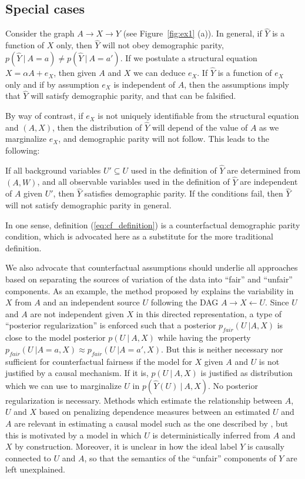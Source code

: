 \subsection{Special cases}

Consider the graph $A \rightarrow X \rightarrow Y$ (see Figure~\ref{fig:ex1} (a)). In general, if $\hat Y$ is a function of $X$ only, then $\hat Y$ will not obey demographic parity, $p(\hat Y\ |\ A = a) \neq p(\hat Y\ |\ A = a')$.  If we postulate a structural equation $X = \alpha A + e_X$, then given $A$ and $X$ we can deduce $e_X$. If $\hat Y$ is a function of $e_X$ only and if by assumption $e_X$ is independent of $A$, then the assumptions imply that $\hat Y$ will satisfy demographic parity, and that can be falsified.

By way of contrast, if $e_X$ is not uniquely identifiable from the structural equation and $(A, X)$, then the distribution of $\hat Y$ will depend of the value of $A$ as we marginalize $e_X$, and demographic parity will not follow. This leads to the following:

\begin{lem}
If all background variables $U' \subseteq U$ used in the definition of $\hat Y$ are determined from $(A, W)$, and all observable variables used in the definition of $\hat Y$ are independent of $A$ given $U'$, then $\hat Y$ satisfies demographic parity. If the conditions fail, then $\hat Y$ will not satisfy demographic parity in general. 
\end{lem}
  
In one sense, definition (\ref{eq:cf_definition}) is a counterfactual demographic parity condition, which is advocated here as a substitute for the more traditional definition.

We also advocate that counterfactual assumptions should underlie all approaches based on separating the sources of variation of the data into ``fair'' and ``unfair'' components. As an example, the method proposed by \cite{louizos2015variational} explains the variability in $X$ from $A$ and an independent source $U$ following the DAG $A \rightarrow X \leftarrow U$. Since $U$ and $A$ are not independent given $X$ in this directed representation, a type of ``posterior regularization'' \citep{ganchev:10} is enforced such that a posterior $p_{fair}(U\ | A, X)$ is close to the model posterior $p(U\ |\ A, X)$ while having the property $p_{fair}(U\ | A = a, X) \approx p_{fair}(U\ | A = a', X)$. But this is neither necessary nor sufficient for counterfactual fairness if the model for $X$ given $A$ and $U$ is not justified by a causal mechanism. If it is, $p(U\ |\ A, X)$ is justified as distribution which we can use to marginalize $U$ in $p(\hat Y(U)\ |\ A, X)$. No posterior regularization is necessary.  Methods which estimate the relationship between $A$, $U$ and $X$ based on penalizing dependence measures between an estimated $U$ and $A$ are relevant in estimating a causal model such as the one described by \citep{mooij:09}, but this is motivated by a model in which $U$ is deterministically inferred from $A$ and $X$ by construction. Moreover, it is unclear in \cite{louizos2015variational} how the ideal label $Y$ is causally connected to $U$ and $A$, so that the semantics of the ``unfair''
components of $Y$ are left unexplained.


